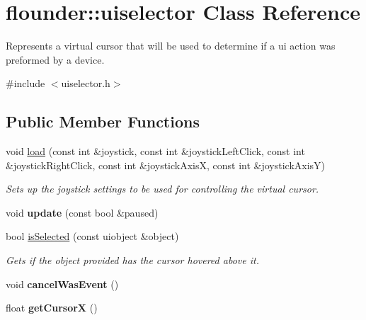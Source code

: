 \hypertarget{classflounder_1_1uiselector}{}\section{flounder\+:\+:uiselector Class Reference}
\label{classflounder_1_1uiselector}


Represents a virtual cursor that will be used to determine if a ui action was preformed by a device.  




{\ttfamily \#include $<$uiselector.\+h$>$}

\subsection*{Public Member Functions}
\begin{DoxyCompactItemize}
\item 
void \hyperlink{classflounder_1_1uiselector_ad6762253d7fbc30fa9ffd548a758113c}{load} (const int \&joystick, const int \&joystick\+Left\+Click, const int \&joystick\+Right\+Click, const int \&joystick\+AxisX, const int \&joystick\+AxisY)
\begin{DoxyCompactList}\small\item\em Sets up the joystick settings to be used for controlling the virtual cursor. \end{DoxyCompactList}\item 
\mbox{\label{classflounder_1_1uiselector_ad1c41e87c7c214ee7fc1aa3d33717449}} 
void {\bfseries update} (const bool \&paused)
\item 
bool \hyperlink{classflounder_1_1uiselector_a308e91174313dbb9073053bbde938134}{is\+Selected} (const uiobject \&object)
\begin{DoxyCompactList}\small\item\em Gets if the object provided has the cursor hovered above it. \end{DoxyCompactList}\item 
\mbox{\label{classflounder_1_1uiselector_a8df56d82dec9199e1de6e9786a9138b2}} 
void {\bfseries cancel\+Was\+Event} ()
\item 
\mbox{\label{classflounder_1_1uiselector_a52dae8a228dcd117227417cc54397d38}} 
float {\bfseries get\+CursorX} ()
\item 

\end{DoxyCompactItemize}
